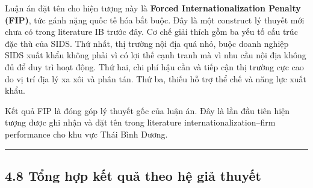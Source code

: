 \documentclass[12pt,a4paper]{article}
\begin{document}
Luận án đặt tên cho hiện tượng này là \textbf{Forced
Internationalization Penalty (FIP)}, tức gánh nặng quốc tế hóa bắt buộc.
Đây là một construct lý thuyết mới chưa có trong literature IB trước
đây. Cơ chế giải thích gồm ba yếu tố cấu trúc đặc thù của SIDS. Thứ
nhất, thị trường nội địa quá nhỏ, buộc doanh nghiệp SIDS xuất khẩu không
phải vì có lợi thế cạnh tranh mà vì nhu cầu nội địa không đủ để duy trì
hoạt động. Thứ hai, chi phí hậu cần và tiếp cận thị trường cực cao do vị
trí địa lý xa xôi và phân tán. Thứ ba, thiếu hỗ trợ thể chế và năng lực
xuất khẩu.

Kết quả FIP là đóng góp lý thuyết gốc của luận án. Đây là lần đầu tiên
hiện tượng được ghi nhận và đặt tên trong literature
internationalization--firm performance cho khu vực Thái Bình Dương.

\begin{center}\rule{0.5\linewidth}{0.5pt}\end{center}

\hypertarget{48-tux1ed5ng-hux1ee3p-kux1ebft-quux1ea3-theo-hux1ec7-giux1ea3-thuyux1ebft}{%
\subsection{4.8 Tổng hợp kết quả theo hệ giả
thuyết}\label{48-tux1ed5ng-hux1ee3p-kux1ebft-quux1ea3-theo-hux1ec7-giux1ea3-thuyux1ebft}}
\end{document}

